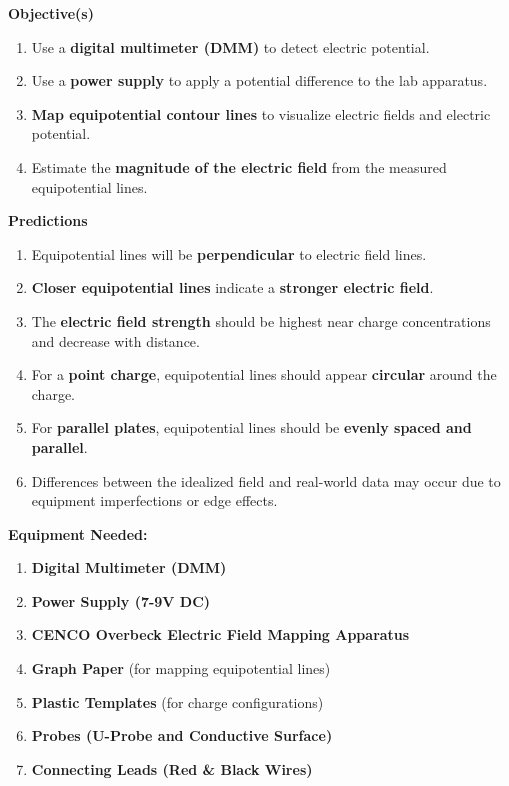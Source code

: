 \documentclass[idxtotoc,hyperref,openany]{labbook} %
\begin{document}
\hfill \break
\textbf{Objective(s)}
\begin{enumerate}[$\bullet$]
    \item Use a \textbf{digital multimeter (DMM)} to detect electric potential.
    \item Use a \textbf{power supply} to apply a potential difference to the lab apparatus.
    \item \textbf{Map equipotential contour lines} to visualize electric fields and electric potential.
    \item Estimate the \textbf{magnitude of the electric field} from the measured equipotential lines.
\end{enumerate}

\hfill \break
\textbf{Predictions}
\begin{enumerate}[$\bullet$]
    \item Equipotential lines will be \textbf{perpendicular} to electric field lines.
    \item \textbf{Closer equipotential lines} indicate a \textbf{stronger electric field}.
    \item The \textbf{electric field strength} should be highest near charge concentrations and decrease with distance.
    \item For a \textbf{point charge}, equipotential lines should appear \textbf{circular} around the charge.
    \item For \textbf{parallel plates}, equipotential lines should be \textbf{evenly spaced and parallel}.
    \item Differences between the idealized field and real-world data may occur due to equipment imperfections or edge effects.
\end{enumerate}


\textbf{Equipment Needed:}
\begin{enumerate}[$\bullet$]
    \item \textbf{Digital Multimeter (DMM)}
    \item \textbf{Power Supply (7-9V DC)}
    \item \textbf{CENCO Overbeck Electric Field Mapping Apparatus}
    \item \textbf{Graph Paper} (for mapping equipotential lines)
    \item \textbf{Plastic Templates} (for charge configurations)
    \item \textbf{Probes (U-Probe and Conductive Surface)}
    \item \textbf{Connecting Leads (Red \& Black Wires)}
\end{enumerate}
\end{document}
